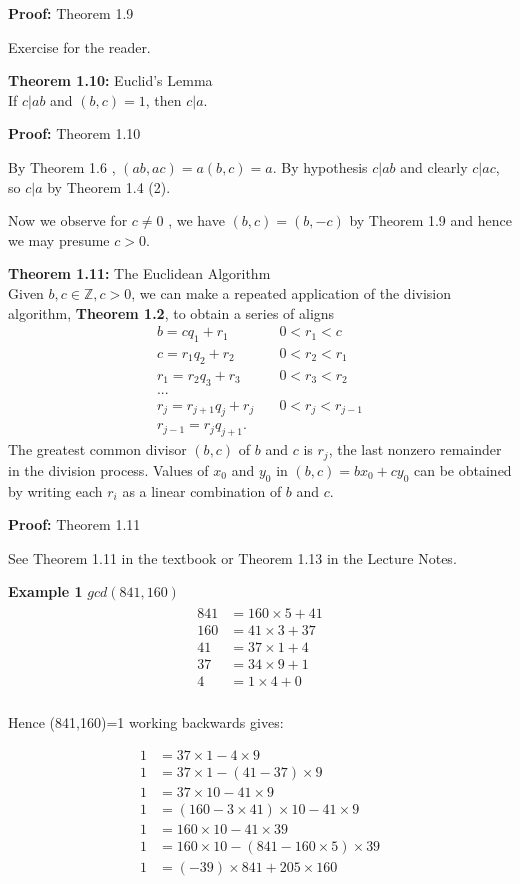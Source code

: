 \documentclass[a4paper]{article}
\begin{document}
\textbf{Proof:} Theorem 1.9

Exercise for the reader.

\textbf{Theorem 1.10:} Euclid's Lemma\\
If $c|ab$ and $(b,c)=1$, then $c|a$.

\textbf{Proof:} Theorem 1.10

By Theorem 1.6 , $(ab,ac)=a(b,c)=a$. By hypothesis $c|ab$ and clearly $c|ac$,
so $c|a$ by Theorem 1.4 (2).

Now we observe for $c\neq 0$ , we have $(b,c)=(b,-c)$ by Theorem 1.9 and
hence we may presume $c>0$.

\textbf{Theorem 1.11:} The Euclidean Algorithm\\
Given $b,c\in\mathbb{Z}, c>0$, we can make a repeated
application of the division algorithm, \textbf{Theorem 1.2},
to obtain a series of aligns
\begin{align}
b=cq_1+r_1          & \quad0<r_1<c\\
c=r_1q_2+r_2        & \quad0<r_2<r_1\\
r_1=r_2q_3+r_3      & \quad0<r_3<r_2\\
...\\
r_j=r_{j+1}q_j+r_j  & \quad0<r_j<r_{j-1}\\
r_{j-1}=r_jq_{j+1}.
\end{align}
The greatest common divisor $(b,c)$ of $b$ and $c$ is $r_j$,
the last nonzero remainder in the division process.
Values of $x_0$ and $y_0$ in $(b,c)=bx_0+cy_0$
can be obtained by writing each $r_i$ as a linear combination
of $b$ and $c$.

\textbf{Proof:} Theorem 1.11

See Theorem 1.11 in the textbook or Theorem 1.13 in the Lecture Notes.


\textbf{Example 1}
$gcd(841,160)$
\begin{align}
\begin{split}
841&=160\times5 + 41 \\
160&=41\times3 + 37 \\
41&=37\times 1 + 4 \\
37&=34\times 9 + 1 \\
4&=1\times 4 + 0 \\
\end{split}
\end{align}

Hence (841,160)=1 working backwards gives:


\begin{align}
1&=37\times1 - 4\times9 \\
1&=37\times1 - (41-37)\times9 \\
1&=37\times10 - 41\times9 \\
1&=(160-3\times41)\times10 - 41 \times 9 \\
1&=160\times10 - 41\times39 \\
1&=160\times10 - (841-160\times5)\times39 \\
1&=(-39)\times841 + 205\times160 \\
\end{align}
\end{document}
